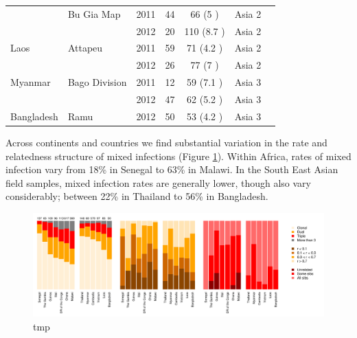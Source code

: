 \documentclass[9pt,lineno]{elife}
\begin{document}
\begin{table}[bt]
\begin{tabular}{l l c c c c c}
                &Bu Gia Map     &2011 &44   &66   (5   )&Asia 2  \\
                &               &2012 &20   &110  (8.7 )&Asia 2  \\
 \hline
Laos            &Attapeu        &2011 &59   &71   (4.2 )&Asia 2  \\
                &               &2012 &26   &77   (7   )&Asia 2  \\
 \hline
Myanmar         &Bago Division  &2011 &12   &59   (7.1 )&Asia 3  \\
                &               &2012 &47   &62   (5.2 )&Asia 3  \\
 \hline
Bangladesh      &Ramu           &2012 &50   &53   (4.2 )&Asia 3  \\
\bottomrule
\end{tabular}
\end{table}

Across continents and countries we find substantial variation in the rate and relatedness structure of mixed infections (Figure \ref{fig:Pf3kResults}).  Within Africa, rates of mixed infection vary from 18\% in Senegal to 63\% in Malawi.  In the South East Asian field samples, mixed infection rates are generally lower, though also vary considerably; between 22\% in Thailand to 56\% in Bangladesh.














\begin{figure}[htp]
  \centering{}
  \includegraphics[width=\textwidth]{barPlots_by_gil.pdf}
  \caption{tmp}\label{fig:Pf3kResults}
\end{figure}
\end{document}
